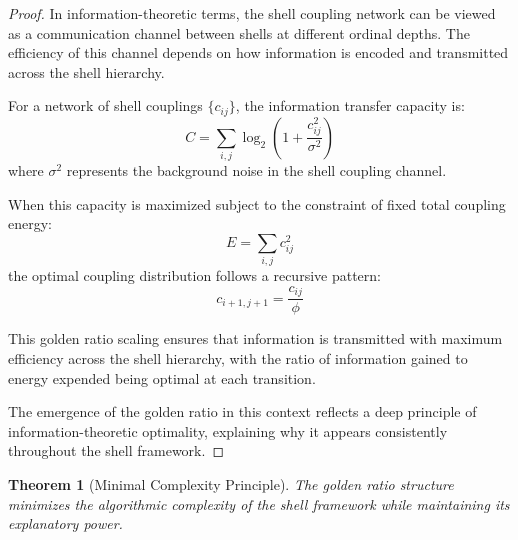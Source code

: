\documentclass[12pt,a4paper]{article}
\newtheorem{theorem}{Theorem}[section]
\begin{document}
    \begin{proof}
    In information-theoretic terms, the shell coupling network can be viewed as a communication channel between shells at different ordinal depths. The efficiency of this channel depends on how information is encoded and transmitted across the shell hierarchy.
    
    For a network of shell couplings $\{c_{ij}\}$, the information transfer capacity is:
    \begin{equation}
    C = \sum_{i,j} \log_2\left(1 + \frac{c_{ij}^2}{\sigma^2}\right)
    \end{equation}
    where $\sigma^2$ represents the background noise in the shell coupling channel.
    
    When this capacity is maximized subject to the constraint of fixed total coupling energy:
    \begin{equation}
    E = \sum_{i,j} c_{ij}^2
    \end{equation}
    the optimal coupling distribution follows a recursive pattern:
    \begin{equation}
    c_{i+1,j+1} = \frac{c_{ij}}{\phi}
    \end{equation}
    
    This golden ratio scaling ensures that information is transmitted with maximum efficiency across the shell hierarchy, with the ratio of information gained to energy expended being optimal at each transition.
    
    The emergence of the golden ratio in this context reflects a deep principle of information-theoretic optimality, explaining why it appears consistently throughout the shell framework.
    \end{proof}
    
    \begin{theorem}[Minimal Complexity Principle]
    \label{thm:minimal-complexity}
    The golden ratio structure minimizes the algorithmic complexity of the shell framework while maintaining its explanatory power.
    \end{theorem}
    
\end{document}
